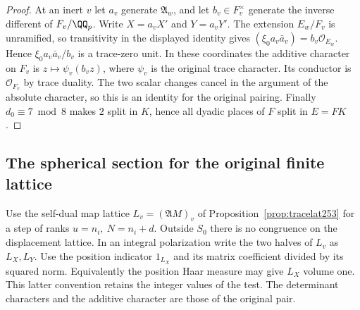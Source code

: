 \documentclass[a4paper,11pt]{article}
\theoremstyle{definition}
\theoremstyle{remark}
\numberwithin{equation}{section}
\begin{document}
\begin{proof}
At an inert \(v\) let \(a_v\) generate \(\mathfrak A_w\),
and let \(b_v\in F_v^\times\) generate the inverse different
of \(F_v/\QQ_p\). Write \(X=a_v X'\) and \(Y=a_vY'\).
The extension \(E_w/F_v\) is unramified, so transitivity in
the displayed identity gives
\((\xi_0 a_v\bar a_v)=b_v\mathcal O_{E_w}\).
Hence \(\xi_0 a_v\bar a_v/b_v\) is a trace-zero unit. In
these coordinates the additive character on \(F_v\) is
\(z\mapsto\psi_v(b_v z)\), where \(\psi_v\) is the original
trace character. Its conductor is \(\mathcal O_{F_v}\) by
trace duality. The two scalar changes cancel in the argument
of the absolute character, so this is an identity for the
original pairing. Finally \(d_0\equiv7\bmod8\) makes \(2\)
split in \(K\), hence all dyadic places of \(F\) split in
\(E=FK\).
\end{proof}

\subsection{The spherical section for the original finite lattice}\label{nav:VI-60}
Use the self-dual map lattice \(L_v=(\mathfrak A M)_v\) of
Proposition~\ref{prop:tracelat253} for a step of ranks
\(u=n_i,\ N=n_i+d\). Outside \(S_0\) there is no congruence on
the displacement lattice. In an integral polarization write the
two halves of \(L_v\) as \(L_X,L_Y\). Use the position indicator
\(1_{L_X}\) and its matrix coefficient divided by its squared
norm. Equivalently the position Haar measure may give \(L_X\)
volume one. This latter convention retains the integer values
of the test. The determinant characters and the additive
character are those of the original pair.
\end{document}
